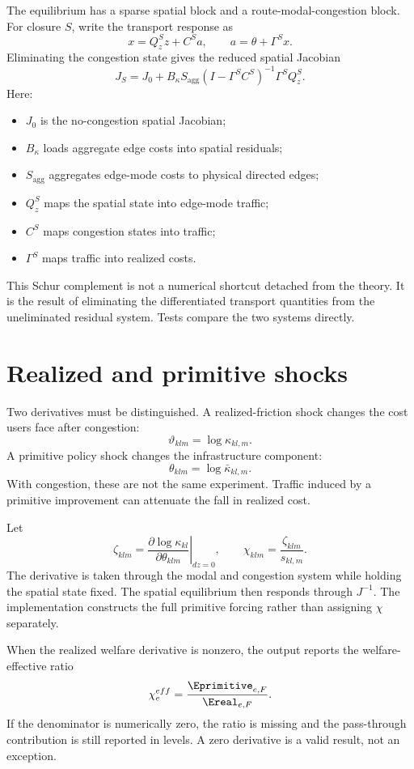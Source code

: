 The equilibrium has a sparse spatial block and a route-modal-congestion block.
For closure \(S\), write the transport response as
\[
 x=Q_z^S z+C^S a,\qquad
 a=\theta+\Gamma^Sx.
\]
Eliminating the congestion state gives the reduced spatial Jacobian
\[
 J_S
 =J_0+B_\kappa S_{\mathrm{agg}}
 (I-\Gamma^SC^S)^{-1}
 \Gamma^SQ_z^S.
\]
Here:
\begin{itemize}
  \item \(J_0\) is the no-congestion spatial Jacobian;
  \item \(B_\kappa\) loads aggregate edge costs into spatial residuals;
  \item \(S_{\mathrm{agg}}\) aggregates edge-mode costs to physical directed
  edges;
  \item \(Q_z^S\) maps the spatial state into edge-mode traffic;
  \item \(C^S\) maps congestion states into traffic;
  \item \(\Gamma^S\) maps traffic into realized costs.
\end{itemize}

This Schur complement is not a numerical shortcut detached from the theory. It
is the result of eliminating the differentiated transport quantities from the
uneliminated residual system. Tests compare the two systems directly.

\section{Realized and primitive shocks}

Two derivatives must be distinguished. A realized-friction shock changes the
cost users face after congestion:
\[
 \vartheta_{klm}=\log\kappa_{kl,m}.
\]
A primitive policy shock changes the infrastructure component:
\[
 \theta_{klm}=\log\bar\kappa_{kl,m}.
\]
With congestion, these are not the same experiment. Traffic induced by a
primitive improvement can attenuate the fall in realized cost.

Let
\[
 \zeta_{klm}
 =\left.
 \frac{\partial\log\kappa_{kl}}
      {\partial\theta_{klm}}
 \right|_{dz=0},
 \qquad
 \chi_{klm}=\frac{\zeta_{klm}}{s_{kl,m}}.
\]
The derivative is taken through the modal and congestion system while holding
the spatial state fixed. The spatial equilibrium then responds through
\(J^{-1}\). The implementation constructs the full primitive forcing rather
than assigning \(\chi\) separately.

When the realized welfare derivative is nonzero, the output reports the
welfare-effective ratio
\[
 \chi_e^{eff}=\frac{\Eprimitive_{e,F}}{\Ereal_{e,F}}.
\]
If the denominator is numerically zero, the ratio is missing and the
pass-through contribution is still reported in levels. A zero derivative is a
valid result, not an exception.

